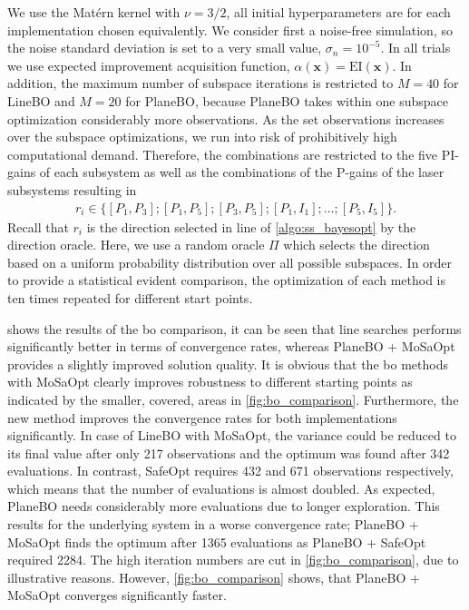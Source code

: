 \documentclass{ifacconf}
\newcommand{\linea}[1]{line\:{\footnotesize \textbf{(#1)}}}
\newcommand{\bx}{\bm{x}}
\begin{document}
We use the Mat\'ern kernel with \(\nu = 3/2\), all initial hyperparameters are for each implementation chosen equivalently. We consider first a noise-free simulation, so the noise standard deviation is set to a very small value, \(\sigma_n = 10^{-5}\). In all trials we use expected improvement acquisition function, \(\alpha(\bx) = \mathrm{EI}(\bx)\). In addition, the maximum number of subspace iterations is restricted to \(M=40\) for LineBO and \(M=20\) for PlaneBO, because PlaneBO takes within one subspace optimization considerably more observations. As the set observations increases over the subspace optimizations, we run into risk of prohibitively high computational demand. Therefore, the combinations are restricted to the five PI-gains of each subsystem as well as the combinations of the P-gains of the laser subsystems resulting in
\begin{align*}
    r_i \in \bigg\{[P_1,P_3];[P_1,P_5];[P_3,P_5];[P_1,I_1];\dots;[P_5,I_5]\bigg\}.
\end{align*}
Recall that \(r_i\) is the direction selected in \linea{2} of \cref{algo:ss_bayesopt} by the direction oracle.
Here, we use a random oracle \(\Pi\) which selects the direction based on a uniform probability distribution over all possible subspaces. 
In order to provide a statistical evident comparison, the optimization of each method is ten times repeated for different start points.

 shows the results of the \gls{bo} comparison, it can be seen that line searches performs significantly better in terms of convergence rates, whereas PlaneBO + MoSaOpt provides a slightly improved solution quality. It is obvious that the \gls{bo} methods with MoSaOpt clearly improves robustness to different starting points as indicated by the smaller, covered, areas in \cref{fig:bo_comparison}. Furthermore, the new method improves the convergence rates for both implementations significantly. In case of LineBO with MoSaOpt, the variance could be reduced to its final value after only 217 observations and the optimum was found after 342 evaluations. In contrast, SafeOpt requires 432 and 671 observations respectively, which means that the number of evaluations is almost doubled. As expected, PlaneBO needs considerably more evaluations due to longer exploration. This results for the underlying system in a worse convergence rate; PlaneBO + MoSaOpt finds the optimum after 1365 evaluations as PlaneBO + SafeOpt required 2284. The high iteration numbers are cut in \cref{fig:bo_comparison}, due to illustrative reasons. However, \cref{fig:bo_comparison} shows, that PlaneBO + MoSaOpt converges significantly faster. 
\end{document}
